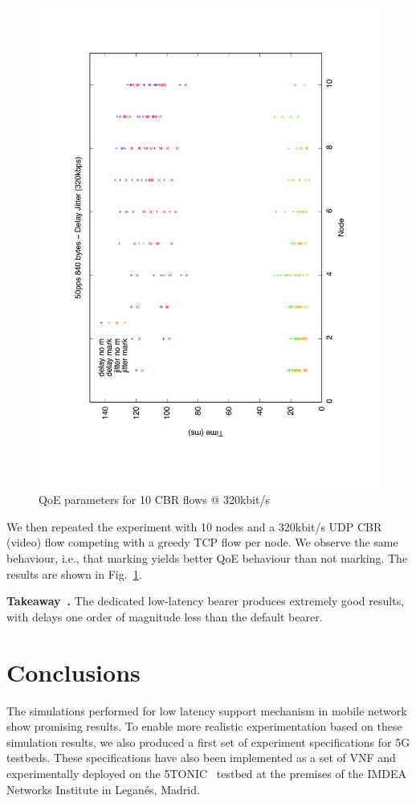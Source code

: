 \documentclass[12pt]{article}
\newcounter{takeaway}[section]
\newenvironment{takeaway}[1][]{\refstepcounter{takeaway}\par\medskip
   \noindent \textbf{Takeaway~\thetakeaway. #1} }{\medskip}
\newcommand{\reffig}[1]{Fig.~\ref{#1}}
\begin{document}
\begin{figure}[t]
  \centering
  \includegraphics[page=1,angle=270,trim=40 40 40 40,width=.6\textwidth]{images/mvideo-Mvideo-10}
  \caption{\label{fig:video-10}QoE parameters for 10 CBR flows @ 320kbit/s}
\end{figure}

We then repeated the experiment with 10 nodes and a 320kbit/s UDP CBR (video)
flow competing with a greedy TCP flow per node. We observe the same behaviour,
i.e., that marking yields better QoE behaviour than not marking. The results
are shown in \reffig{fig:video-10}.

\begin{takeaway}
  The dedicated low-latency bearer produces extremely good results, with delays
  one order of magnitude less than the default bearer.
\end{takeaway}

\section{Conclusions}
\label{S:4}

The simulations performed for low latency support mechanism in mobile network
show promising results.  To enable more realistic experimentation based on
these simulation results, we also produced a first set of experiment
specifications for 5G testbeds. These specifications have also been implemented
as a set of VNF and experimentally deployed on the 5TONIC~\cite{5tonic} testbed
at the premises of the IMDEA Networks Institute in Legan\'es, Madrid.


\small

\end{document}
